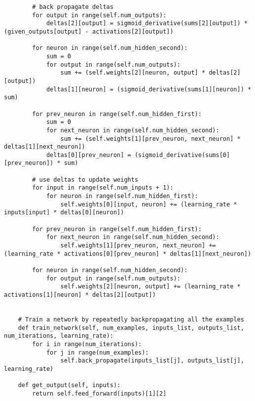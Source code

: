 \documentclass[11pt]{article} %
\begin{document}
\begin{lstlisting}
        # back propagate deltas
        for output in range(self.num_outputs):
            deltas[2][output] = sigmoid_derivative(sums[2][output]) * (given_outputs[output] - activations[2][output])
            
        for neuron in range(self.num_hidden_second):
            sum = 0
            for output in range(self.num_outputs):
                sum += (self.weights[2][neuron, output] * deltas[2][output])
            deltas[1][neuron] = (sigmoid_derivative(sums[1][neuron]) * sum)
            
        for prev_neuron in range(self.num_hidden_first):
            sum = 0
            for next_neuron in range(self.num_hidden_second):
                sum += (self.weights[1][prev_neuron, next_neuron] * deltas[1][next_neuron])
            deltas[0][prev_neuron] = (sigmoid_derivative(sums[0][prev_neuron]) * sum)
            
        # use deltas to update weights
        for input in range(self.num_inputs + 1):
            for neuron in range(self.num_hidden_first):
                self.weights[0][input, neuron] += (learning_rate * inputs[input] * deltas[0][neuron])
                
        for prev_neuron in range(self.num_hidden_first):
            for next_neuron in range(self.num_hidden_second):
                self.weights[1][prev_neuron, next_neuron] += (learning_rate * activations[0][prev_neuron] * deltas[1][next_neuron])

        for neuron in range(self.num_hidden_second):
            for output in range(self.num_outputs):
                self.weights[2][neuron, output] += (learning_rate * activations[1][neuron] * deltas[2][output])
                
                
    # Train a network by repeatedly backpropagating all the examples
    def train_network(self, num_examples, inputs_list, outputs_list, num_iterations, learning_rate):
        for i in range(num_iterations):
            for j in range(num_examples):
                self.back_propagate(inputs_list[j], outputs_list[j], learning_rate)  
                
    def get_output(self, inputs):
        return self.feed_forward(inputs)[1][2]
\end{lstlisting}
\end{document}
